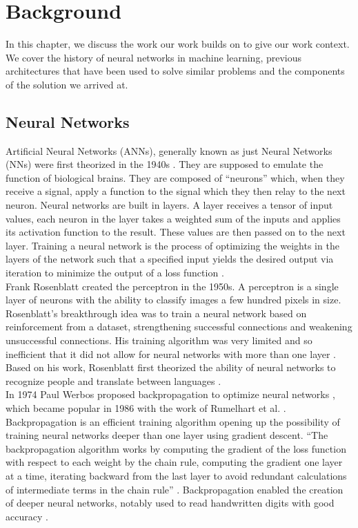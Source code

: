 \chapter{Background\label{cha:background}}
In this chapter, we discuss the work our work builds on to give our work context. We cover the history of neural networks in machine learning, previous architectures that have been used to solve similar problems and the components of the solution we arrived at.  

\section{Neural Networks}
Artificial Neural Networks (ANNs), generally known as just Neural Networks (NNs) were first theorized in the 1940s \cite{mcculloch_logical_1943}. They are supposed to emulate the function of biological brains. They are composed of \enquote{neurons} which, when they receive a signal, apply a function to the signal which they then relay to the next neuron. Neural networks are built in layers. A layer receives a tensor of input values, each neuron in the layer takes a weighted sum of the inputs and applies its activation function to the result. These values are then passed on to the next layer. Training a neural network is the process of optimizing the weights in the layers of the network such that a specified input yields the desired output via iteration to minimize the output of a loss function \cite{goodfellow_deep_2016}.\\
Frank Rosenblatt created the perceptron in the 1950s. A perceptron is a single layer of neurons with the ability to classify images a few hundred pixels in size. Rosenblatt's breakthrough idea was to train a neural network based on reinforcement from a dataset, strengthening successful connections and weakening unsuccessful connections. His training algorithm was very limited and so inefficient that it did not allow for neural networks with more than one layer \cite{rosenblatt_perceptron_1958}. Based on his work, Rosenblatt first theorized the ability of neural networks to recognize people and translate between languages \cite{vandeput_brief_nodate}.\\
In 1974 Paul Werbos proposed backpropagation to optimize neural networks \cite{Werbos:74}, which became popular in 1986  with the work of Rumelhart et al. \cite{rumelhart_learning_1986}.  Backpropagation is an efficient training algorithm opening up the possibility of training neural networks deeper than one layer using gradient descent. \enquote{The backpropagation algorithm works by computing the gradient of the loss function with respect to each weight by the chain rule, computing the gradient one layer at a time, iterating backward from the last layer to avoid redundant calculations of intermediate terms in the chain rule} \cite{noauthor_backpropagation_2022}. Backpropagation enabled the creation of deeper neural networks, notably used to read handwritten digits with good accuracy \cite{lecun_backpropagation_1989}.\\

